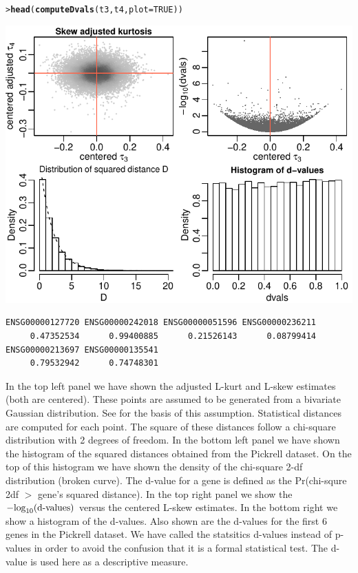 \documentclass[a4paper, 10pt]{article}\usepackage[]{graphicx}\usepackage[]{color}
\makeatletter
\def\maxwidth{ %
  \ifdim\Gin@nat@width>\linewidth
    \linewidth
  \else
    \Gin@nat@width
  \fi
}
\newcommand{\hlnum}[1]{\textcolor[rgb]{0.686,0.059,0.569}{#1}}%
\newcommand{\hlstd}[1]{\textcolor[rgb]{0.345,0.345,0.345}{#1}}%
\newcommand{\hlkwc}[1]{\textcolor[rgb]{0.333,0.667,0.333}{#1}}%
\newcommand{\hlkwd}[1]{\textcolor[rgb]{0.737,0.353,0.396}{\textbf{#1}}}%
\newenvironment{kframe}{%
 \def\at@end@of@kframe{}%
 \ifinner\ifhmode%
  \def\at@end@of@kframe{\end{minipage}}%
  \begin{minipage}{\columnwidth}%
 \fi\fi%
 \def\FrameCommand##1{\hskip\@totalleftmargin \hskip-\fboxsep
 \colorbox{shadecolor}{##1}\hskip-\fboxsep
     \hskip-\linewidth \hskip-\@totalleftmargin \hskip\columnwidth}%
 \MakeFramed {\advance\hsize-\width
   \@totalleftmargin\z@ \linewidth\hsize
   \@setminipage}}%
 {\par\unskip\endMakeFramed%
 \at@end@of@kframe}
\newenvironment{knitrout}{}{} %
\makeatother
\begin{document}
\begin{knitrout}\small
{}\color{fgcolor}\begin{kframe}
\begin{alltt}
\hlstd{> }\hlkwd{head}\hlstd{(}\hlkwd{computeDvals}\hlstd{(t3, t4,} \hlkwc{plot}\hlstd{=}\hlnum{TRUE}\hlstd{))}
\end{alltt}
\end{kframe}

{\centering \includegraphics[width=\maxwidth]{figure/volatilePickrell-1} 

}


\begin{kframe}\begin{verbatim}
ENSG00000127720 ENSG00000242018 ENSG00000051596 ENSG00000236211 
     0.47352534      0.99400885      0.21526143      0.08799414 
ENSG00000213697 ENSG00000135541 
     0.79532942      0.74748301 
\end{verbatim}
\end{kframe}
\end{knitrout}

\noindent In the top left panel we have shown the
adjusted L-kurt and L-skew estimates (both are centered).
These points are assumed to be generated from a bivariate
Gaussian distribution. See \cite{Hosking1990} for the 
basis of this assumption. 
Statistical distances are computed for each point.
The square of these distances follow a chi-square distribution
with 2 degrees of freedom. In the bottom left panel we have
shown the histogram of the squared distances obtained from the 
Pickrell dataset. On the top of this histogram we have shown the
density of the chi-square 2-df distribution (broken curve).
The d-value for a gene is defined as the
Pr(chi-squre 2df $>$ gene's squared distance). 
In the top right panel we show the $-\hbox{log}_{10}(\hbox{d-values})$
versus the centered L-skew estimates. 
In the bottom right we show a histogram of the d-values.
Also shown are the d-values for the first 6 genes in 
the Pickrell dataset. We have called the statsitics
d-values instead of p-values in order to avoid the 
confusion that it is a formal statistical test. 
The d-value is used here as a descriptive measure.
\end{document}
